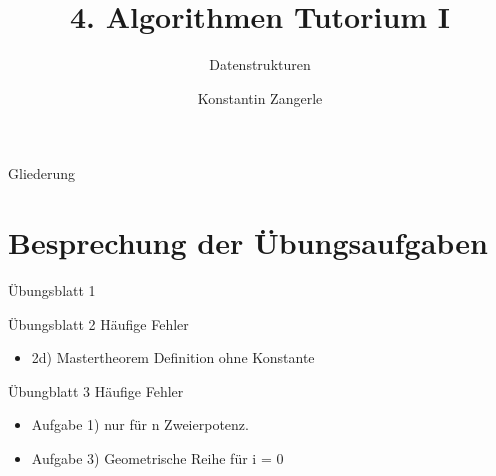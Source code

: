\documentclass[18pt]{beamer}
\title[Algo I Tut]{4. Algorithmen Tutorium I}
\subtitle{Datenstrukturen}
\author[Zangerle]{Konstantin Zangerle}
\institute{Institut für Theoretische Informatik}
\begin{document}

\begin{frame}
\titlepage
\end{frame}

\begin{frame}{Gliederung}
 \tableofcontents
\end{frame}


\section{Besprechung der Übungsaufgaben}
\begin{frame}{Übungsblatt 1}
\end{frame}

\begin{frame}[fragile]{Übungsblatt 2}
Häufige Fehler
\begin{itemize}
 \item 2d) Mastertheorem Definition ohne Konstante
\end{itemize}
\end{frame}

\begin{frame}{Übungblatt 3}
Häufige Fehler
\begin{itemize}
 \item Aufgabe 1) nur für n Zweierpotenz.
 \item Aufgabe 3) Geometrische Reihe für i = 0 
\end{itemize}
\end{frame}
\end{document}
